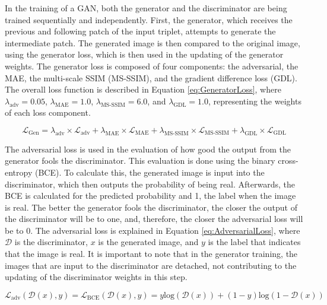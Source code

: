 In the training of a GAN, both the generator and the discriminator are being trained sequentially and independently. First, the generator, which receives the previous and following patch of the input triplet, attempts to generate the intermediate patch. The generated image is then compared to the original image, using the generator loss, which is then used in the updating of the generator weights. The generator loss is composed of four components: the adversarial, the MAE, the multi-scale SSIM (MS-SSIM), and the gradient difference loss (GDL). The overall loss function is described in Equation \ref{eq:GeneratorLoss}, where $\lambda_{\text{adv}}=0.05$, $\lambda_{\text{MAE}}=1.0$, $\lambda_{\text{MS-SSIM}}=6.0$, and $\lambda_{\text{GDL}}=1.0$, representing the weights of each loss component.

\begin{equation}
	\mathcal{L}_{\text{Gen}} = \lambda_{\text{adv}} \times \mathcal{L}_{\text{adv}} + \lambda_{\text{MAE}} \times \mathcal{L}_{\text{MAE}} + \lambda_{\text{MS-SSIM}} \times \mathcal{L}_{\text{MS-SSIM}} + \lambda_{\text{GDL}} \times \mathcal{L}_{\text{GDL}}
	\label{eq:GeneratorLoss}
\end{equation}

The adversarial loss is used in the evaluation of how good the output from the generator fools the discriminator. This evaluation is done using the binary cross-entropy (BCE). To calculate this, the generated image is input into the discriminator, which then outputs the probability of being real. Afterwards, the BCE is calculated for the predicted probability and 1, the label when the image is real. The better the generator fools the discriminator, the closer the output of the discriminator will be to one, and, therefore, the closer the adversarial loss will be to 0. The adversarial loss is explained in Equation \ref{eq:AdversarialLoss}, where $\mathcal{D}$ is the discriminator, $x$ is the generated image, and $y$ is the label that indicates that the image is real. It is important to note that in the generator training, the images that are input to the discriminator are detached, not contributing to the updating of the discriminator weights in this step.

\begin{equation}
	\mathcal{L}_{\text{adv}} (\mathcal{D}(x), y) = \mathcal{L}_{\text{BCE}} (\mathcal{D}(x), y) = y \text{log}(\mathcal{D}(x)) + (1 - y)\text{log}(1 - \mathcal{D}(x))
	\label{eq:AdversarialLoss}
\end{equation}

